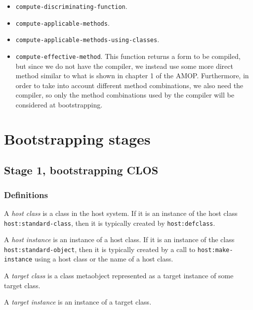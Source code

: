 \begin{itemize}
\item \texttt{compute-discriminating-function}.
\item \texttt{compute-applicable-methods}.
\item \texttt{compute-applicable-methods-using-classes}.
\item \texttt{compute-effective-method}.  This function returns a form
  to be compiled, but since we do not have the compiler, we instead
  use some more direct method similar to what is shown in chapter 1 of
  the AMOP.  Furthermore, in order to take into account different
  method combinations, we also need the compiler, so only the method
  combinations used by the compiler will be considered at
  bootstrapping.
\end{itemize}

\section{Bootstrapping stages}

\subsection{Stage 1, bootstrapping CLOS}

\subsubsection{Definitions}

\begin{definition}
A \emph{host class} is a class in the host system.  If it is an
instance of the host class \texttt{host:standard-class}, then it is
typically created by \texttt{host:defclass}.
\end{definition}

\begin{definition}
A \emph{host instance} is an instance of a host class.  If it is an
instance of the class \texttt{host:standard-object}, then it is
typically created by a call to \texttt{host:make-instance} using a
host class or the name of a host class.
\end{definition}

\begin{definition}
A \emph{target class} is a class metaobject represented as a target
instance of some target class. 
\end{definition}

\begin{definition}
A \emph{target instance} is an instance of a target class.
\end{definition}

